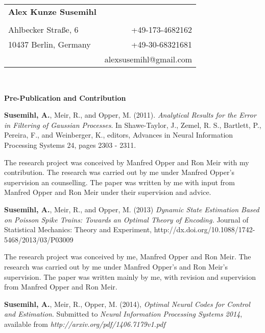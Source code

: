 \documentclass[10pt]{article}
\begin{document}
\thispagestyle{empty}
\begin{tabular*}{6.5in}{l@{\extracolsep{\fill}}r}
\LARGE{\bf Alex Kunze Susemihl}& \\
&\\
\footnotesize{Ahlbecker Stra{\ss}e, 6}&\footnotesize{+49-173-4682162} \\
\footnotesize{10437 Berlin, Germany}&\footnotesize{+49-30-68321681}\\
&\footnotesize{alexsusemihl@gmail.com} \\
\end{tabular*}
\\
\vspace{0.2in}

\vspace{0.15in}
{\large \textbf{Pre-Publication and Contribution}}
\vspace{0.3in}

\hspace{0.1in}\parbox[l]{6.4in}{	{\bf Susemihl, A.}, Meir, R., and Opper, M. (2011). \emph{Analytical Results for the Error in Filtering of Gaussian Processes}. In Shawe-Taylor, J., Zemel, R. S., Bartlett, P., Pereira, F., and Weinberger, K., editors, Advances in Neural Information Processing Systems 24, pages 2303 - 2311.}
\vspace{0.1in}

The research project was conceived by Manfred Opper and Ron Meir with my contribution. The research was carried out by me under Manfred Opper's supervision an counselling. The
paper was written by me with input from Manfred Opper and Ron Meir under their supervision and advice.\par

\vspace{0.15in}

\hspace{0.1in}\parbox[l]{6.4in}{	{\bf Susemihl, A.}, Meir, R., and Opper, M. (2013) \emph{Dynamic State Estimation Based on Poisson Spike Trains: Towards an Optimal Theory of Encoding.} Journal of Statistical Mechanics: Theory and Experiment, http://dx.doi.org/10.1088/1742-5468/2013/03/P03009}
\vspace{0.1in}

The research project was conceived by me, Manfred Opper and Ron Meir. The research was carried out by me under Manfred Opper's and Ron Meir's supervision. The paper was written
mainly by me, with revision and supervision from Manfred Opper and Ron Meir.

\vspace{0.15in}
\hspace{0.1in}\parbox[l]{6.4in}{{\bf Susemihl, A.}, Meir, R., Opper, M. (2014), \emph{Optimal Neural Codes for Control and Estimation}. Submitted to {\em Neural Information Processing Systems 2014}, available from \emph{http://arxiv.org/pdf/1406.7179v1.pdf}}
\vspace{0.1in}
\end{document}
